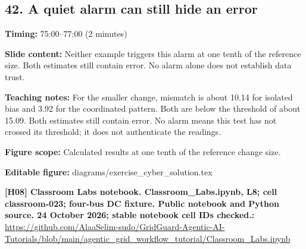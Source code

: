 \documentclass[10pt,letterpaper]{article}
\begin{document}
\subsection*{42. A quiet alarm can still hide an error}
\textbf{Timing:} 75:00--77:00 (2 minutes)\par
\textbf{Slide content:} Neither example triggers this alarm at one tenth of the reference size.
Both estimates still contain error. No alarm alone does not establish data trust.\par
\textbf{Teaching notes:} For the smaller change, mismatch is about 10.14 for isolated bias and 3.92 for the coordinated pattern. Both are below the threshold of about 15.09. Both estimates still contain error. No alarm means this test has not crossed its threshold; it does not authenticate the readings.\par
\textbf{Figure scope:} Calculated results at one tenth of the reference change size.\par
\textbf{Editable figure:} diagrams/exercise\_cyber\_solution.tex\par
\textbf{[H08] Classroom Labs notebook. Classroom\_Labs.ipynb, L8; cell classroom-023; four-bus DC fixture. Public notebook and Python source. 24 October 2026; stable notebook cell IDs checked.:} \href{https://github.com/AlaaSelim-sudo/GridGuard-Agentic-AI-Tutorials/blob/main/agentic_grid_workflow_tutorial/Classroom_Labs.ipynb}{\small\ttfamily https:/\allowbreak{}/\allowbreak{}github.\allowbreak{}com/\allowbreak{}AlaaSelim-\allowbreak{}sudo/\allowbreak{}GridGuard-\allowbreak{}Agentic-\allowbreak{}AI-\allowbreak{}Tutorials/\allowbreak{}blob/\allowbreak{}main/\allowbreak{}agentic\_\allowbreak{}grid\_\allowbreak{}workflow\_\allowbreak{}tutorial/\allowbreak{}Classroom\_\allowbreak{}Labs.\allowbreak{}ipynb}\par
\par\medskip
\end{document}
